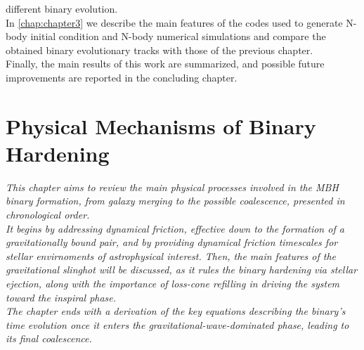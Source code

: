 \documentclass[12pt,twoside,openany]{book}
\begin{document}
different binary evolution.\\In \autoref{chap:chapter3} we describe the main features of the codes used to generate N-body initial condition and N-body numerical simulations and compare the obtained binary evolutionary tracks with those of the previous chapter.\\Finally, the main results of this work are summarized, and possible future improvements are reported in the concluding chapter.






 


%









\chapter{Physical Mechanisms of Binary Hardening}\label{chap:chapter1}




\vspace*{\fill}

\begin{center}
\begin{minipage}{0.65\textwidth}
\centering
\textit{This chapter aims to review the main physical processes involved in the MBH binary formation, from galaxy merging to the possible coalescence, presented in chronological order.\\It begins by addressing dynamical friction, effective down to the formation of a gravitationally bound pair, and by providing dynamical friction timescales for stellar envirnoments of astrophysical interest. Then, the main features of the gravitational slinghot will be discussed, as it rules the binary hardening via stellar ejection, along with the importance of loss-cone refilling in driving the system toward the inspiral phase.\\The chapter ends with a derivation of the key equations describing the binary's time evolution once it enters the gravitational-wave-dominated phase, leading to its final coalescence.}
\end{minipage}
\end{center}

\vspace*{\fill}
\end{document}
